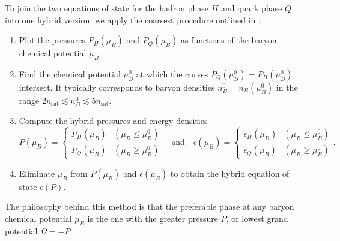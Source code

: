 To join the two equations of state for the hadron phase $H$ and quark phase $Q$ into one hybrid version,
we apply the coarsest procedure outlined in \cite[section V-C]{ref:quark_star_review}:
\begin{enumerate}
\item \label{step:hybrid:one}%
      Plot the pressures $P_H(\mu_B)$ and $P_Q(\mu_B)$ as functions of the baryon chemical potential $\mu_B$.
\item \label{step:hybrid:two}%
      Find the chemical potential $\mu_B^0$ at which the curves $P_Q(\mu_B^0) = P_H(\mu_B^0)$ intersect.
      It typically corresponds to baryon densities $n_B^0 = n_B(\mu_B^0)$ in the range $2 n_\text{sat} \lesssim n_B^0 \lesssim 5 n_\text{sat}$.
\item \label{step:hybrid:three}%
      Compute the hybrid pressures and energy densities
      \begin{equation}
          P(\mu_B) = \begin{cases} P_H(\mu_B) & (\mu_B \leq \mu_B^0) \\ P_Q(\mu_B) & (\mu_B \geq \mu_B^0)  \end{cases}
          \quad \text{and} \quad
          \epsilon(\mu_B) = \begin{cases} \epsilon_H(\mu_B) & (\mu_B \leq \mu_B^0) \\ \epsilon_Q(\mu_B) & (\mu_B \geq \mu_B^0) \end{cases}.
      \label{eq:hybrid:pressure_energy_density}
      \end{equation}
\item \label{step:hybrid:four}%
      Eliminate $\mu_B$ from $P(\mu_B)$ and $\epsilon(\mu_B)$ to obtain the hybrid equation of state $\epsilon(P)$.
\end{enumerate}
The philosophy behind this method is that the preferable phase at any baryon chemical potential $\mu_B$ is the one with the greater pressure $P$, or lowest grand potential $\Omega = -P$.

